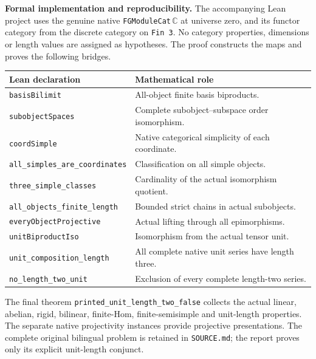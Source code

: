 \documentclass[11pt,a4paper]{article}
\newcommand{\C}{\mathbb C}
\begin{document}
\newpage
\textbf{Formal implementation and reproducibility.}
The accompanying Lean project uses the genuine native
\texttt{FGModuleCat}\,$\C$ at universe zero, and its functor category from the
discrete category on \texttt{Fin 3}. No category properties, dimensions or length
values are assigned as hypotheses. The proof constructs the maps and proves the
following bridges.

\begin{center}
\small
\begin{tabular}{@{}p{}p{}@{}}
\toprule
Lean declaration & Mathematical role\\
\midrule
\texttt{basisBilimit} & All-object finite basis biproducts.\\
\texttt{subobjectSpaces} & Complete subobject--subspace order isomorphism.\\
\texttt{coordSimple} & Native categorical simplicity of each coordinate.\\
\texttt{all\_simples\_are\_coordinates} & Classification on all simple objects.\\
\texttt{three\_simple\_classes} & Cardinality of the actual isomorphism quotient.\\
\texttt{all\_objects\_finite\_length} & Bounded strict chains in actual subobjects.\\
\texttt{everyObjectProjective} & Actual lifting through all epimorphisms.\\
\texttt{unitBiproductIso} & Isomorphism from the actual tensor unit.\\
\texttt{unit\_composition\_length} & All complete native unit series have length three.\\
\texttt{no\_length\_two\_unit} & Exclusion of every complete length-two series.\\
\bottomrule
\end{tabular}
\end{center}

The final theorem \texttt{printed\_unit\_length\_two\_false} collects the actual
linear, abelian, rigid, bilinear, finite-Hom, finite-semisimple and unit-length
properties. The separate native projectivity instances provide projective
presentations. The complete original bilingual problem is retained in
\texttt{SOURCE.md}; the report proves only its explicit unit-length conjunct.
\end{document}
